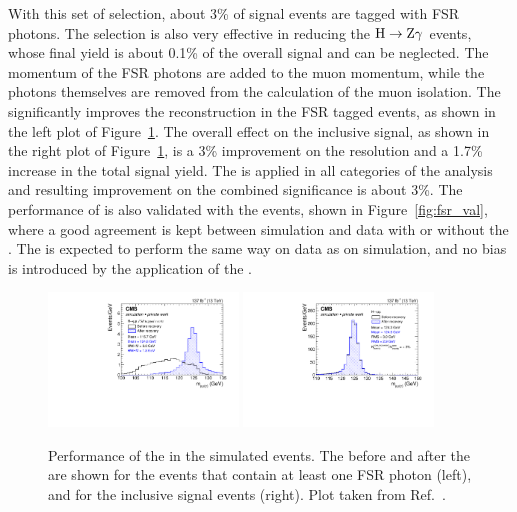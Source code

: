With this set of selection, about 3\% of signal events are tagged with FSR photons.
The selection is also very effective in reducing the $\mathrm{H} \to \mathrm{Z}\gamma$ events,
whose final yield is about 0.1\% of the overall \hmm signal and can be neglected.
The momentum of the FSR photons are added to the muon momentum, 
while the photons themselves are removed from the calculation of the muon isolation.
The \FSR significantly improves the \mmm reconstruction in the FSR tagged events, as shown in the left plot of Figure~\ref{fig:fsr_sig}.
The overall effect on the inclusive signal, as shown in the right plot of Figure~\ref{fig:fsr_sig}, 
is a 3\% improvement on the \mmm resolution and a 1.7\% increase in the total signal yield. 
The \FSR is applied in all categories of the \hmm analysis and resulting improvement on the combined significance is about 3\%.
The performance of \FSR is also validated with the \zmm events, shown in Figure~\ref{fig:fsr_val},
where a good agreement is kept between simulation and data with or without the \FSR. 
The \FSR is expected to perform the same way on data as on simulation, 
and no bias is introduced by the application of the \FSR. 

\begin{figure}[!htb]
      \centering
      \captionsetup{justification=justified}
      \includegraphics[width=0.45\textwidth]{pics/muon_corr/FSR/FSRrecovery_FSRtagged.pdf}
      \includegraphics[width=0.45\textwidth]{pics/muon_corr/FSR/FSRrecovery_FullSignal.pdf}
      \caption{Performance of the \FSR in the simulated \hmm events. 
               The \mmm before and after the \FSR are shown for the events that contain at least one FSR photon (left),
               and for the inclusive signal events (right).
               Plot taken from Ref.~\cite{oliverthesis}.}
      \label{fig:fsr_sig}
\end{figure}

